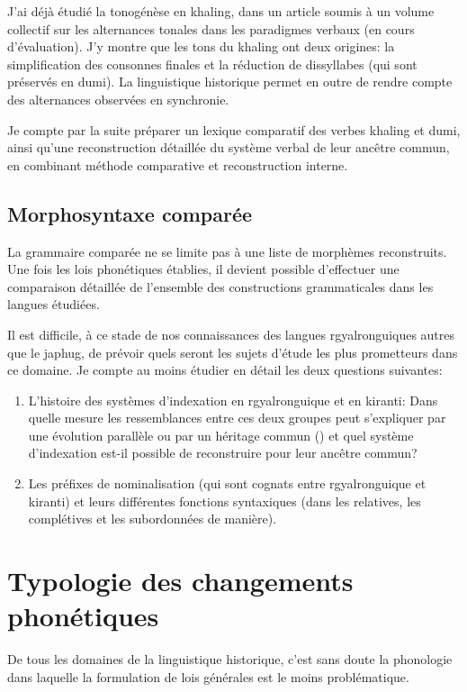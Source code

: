 \documentclass[oldfontcommands,oneside,a4paper,11pt]{article}
\begin{document}
J'ai déjà étudié la tonogénèse en khaling, dans un article soumis à un volume collectif sur les alternances tonales dans les paradigmes verbaux (en cours d'évaluation). J'y montre que les tons du khaling ont deux origines: la simplification des consonnes finales et la réduction de dissyllabes (qui sont préservés en dumi). La linguistique historique permet en outre de rendre compte des alternances observées en synchronie.

Je compte par la suite préparer un lexique comparatif des verbes khaling et dumi, ainsi qu'une reconstruction détaillée du système verbal de leur ancêtre commun, en combinant méthode comparative et reconstruction interne.

\subsection{Morphosyntaxe comparée}
La grammaire comparée ne se limite pas à une liste de morphèmes reconstruits. Une fois les lois phonétiques établies, il devient possible d'effectuer une comparaison détaillée de l'ensemble des constructions grammaticales dans les langues étudiées.

Il est difficile, à ce stade de nos connaissances des langues rgyalronguiques autres que le japhug, de prévoir quels seront les sujets d'étude les plus prometteurs dans ce domaine. Je compte au moins étudier en détail les deux questions suivantes:
\begin{enumerate}
\item L'histoire des systèmes d'indexation en rgyalronguique et en kiranti: Dans quelle mesure les ressemblances entre ces deux groupes peut s'expliquer par une évolution parallèle ou par un héritage commun (\citealt{jacques12agreement}) et quel système d'indexation est-il possible de reconstruire pour leur ancêtre commun?
\item Les préfixes de nominalisation (qui sont cognats entre rgyalronguique et kiranti) et leurs différentes fonctions syntaxiques (dans les relatives, les complétives et les subordonnées de manière).
\end{enumerate}

 



\section{Typologie des changements phonétiques } \label{sec:phonetique}
De tous les domaines de la linguistique historique, c'est sans doute la phonologie dans laquelle la formulation de lois générales est le moins problématique. 
\end{document}
